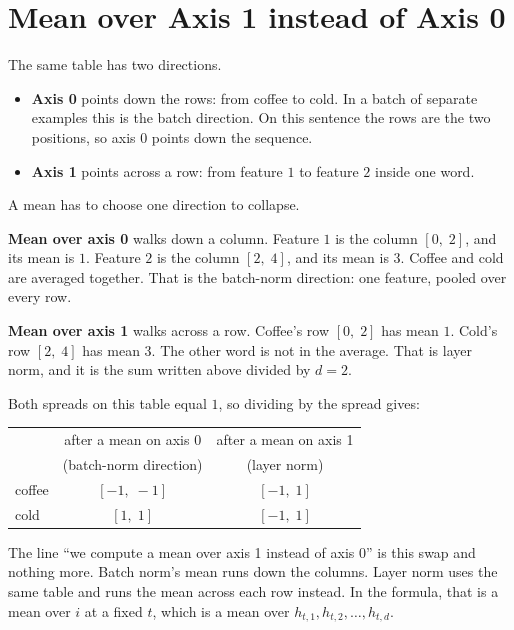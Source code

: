 \documentclass[11pt]{article}
\begin{document}
\section{Mean over Axis 1 instead of Axis 0}
\label{sec:axes}

The same table has two directions.

\begin{itemize}[leftmargin=*]
  \item \textbf{Axis 0} points down the rows: from coffee to cold. In a
        batch of separate examples this is the batch direction. On this
        sentence the rows are the two positions, so axis 0 points down the
        sequence.
  \item \textbf{Axis 1} points across a row: from feature \(1\) to feature
        \(2\) inside one word.
\end{itemize}

A mean has to choose one direction to collapse.

\textbf{Mean over axis 0} walks down a column. Feature \(1\) is the column
\([0,\; 2]\), and its mean is \(1\). Feature \(2\) is the column
\([2,\; 4]\), and its mean is \(3\). Coffee and cold are averaged together.
That is the batch-norm direction: one feature, pooled over every row.

\textbf{Mean over axis 1} walks across a row. Coffee's row \([0,\; 2]\) has
mean \(1\). Cold's row \([2,\; 4]\) has mean \(3\). The other word is not
in the average. That is layer norm, and it is the sum written above divided
by \(d=2\).

Both spreads on this table equal \(1\), so dividing by the spread gives:

\begin{center}
\begin{tabular}{@{}lcc@{}}
\toprule
 & after a mean on axis 0 & after a mean on axis 1 \\
 & (batch-norm direction) & (layer norm) \\
\midrule
coffee & \([-1,\; -1]\) & \([-1,\; 1]\) \\
cold & \([1,\; 1]\) & \([-1,\; 1]\) \\
\bottomrule
\end{tabular}
\end{center}

The line ``we compute a mean over axis 1 instead of axis 0'' is this swap
and nothing more. Batch norm's mean runs down the columns. Layer norm uses
the same table and runs the mean across each row instead. In the formula,
that is a mean over \(i\) at a fixed \(t\), which is a mean over
\(h_{t,1}, h_{t,2}, \ldots, h_{t,d}\).
\end{document}
